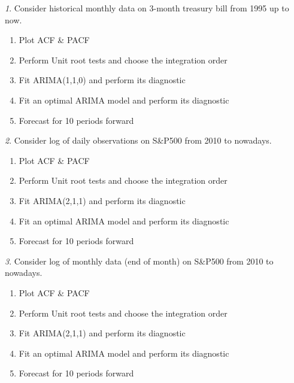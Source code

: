 \documentclass[12pt]{article}
\theoremstyle{remark}
\newtheorem{exercise}{}[section]
\begin{document}
\begin{exercise}
Consider historical monthly data on 3-month treasury bill from 1995 up to now.
\begin{enumerate}
	\item Plot ACF \& PACF 
	\item Perform Unit root tests and choose the integration order
	\item Fit ARIMA(1,1,0) and perform its diagnostic
	\item Fit an optimal ARIMA model and perform its diagnostic
	\item Forecast for 10 periods forward
\end{enumerate}
\end{exercise}

\begin{exercise}
Consider log of daily observations on S\&P500 from 2010 to nowadays.
\begin{enumerate}
	\item Plot ACF \& PACF 
	\item Perform Unit root tests and choose the integration order
	\item Fit ARIMA(2,1,1) and perform its diagnostic
	\item Fit an optimal ARIMA model and perform its diagnostic
	\item Forecast for 10 periods forward
\end{enumerate}
\end{exercise}

\begin{exercise}
Consider log of monthly data (end of month) on S\&P500 from 2010 to nowadays.
\begin{enumerate}
	\item Plot ACF \& PACF 
	\item Perform Unit root tests and choose the integration order
	\item Fit ARIMA(2,1,1) and perform its diagnostic
	\item Fit an optimal ARIMA model and perform its diagnostic
	\item Forecast for 10 periods forward
\end{enumerate}
\end{exercise}
	
\end{document}
